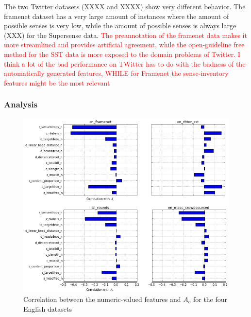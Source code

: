 \documentclass[11pt,a4paper]{article}
\begin{document}
The two Twitter datasets (XXXX and XXXX) show very different behavior. The framenet dataset has a very large  amount of instances where the amount of possible senses is very low, while the amount of possible senses is always large (XXX) for the Supersense data. \textcolor{red}{The preannotation of the framenet data makes it more streamlined and provides artificial agreement, while the open-guideline free method for the SST data is more exposed to the domain problems of Twitter. I think a lot of the bad performance on TWitter has to do with the badness of the automatically generated features, WHILE for Framenet the sense-inventory features might be the most relevant}


%

%
%

\subsubsection{Analysis}

\begin{figure}[htt]
\includegraphics[scale=0.3]{corrtable.jpg}

\caption{ \label{fig:correlations}Correlation between the numeric-valued features and $A_o$ for the four English datasets}    
\end{figure}
\end{document}
